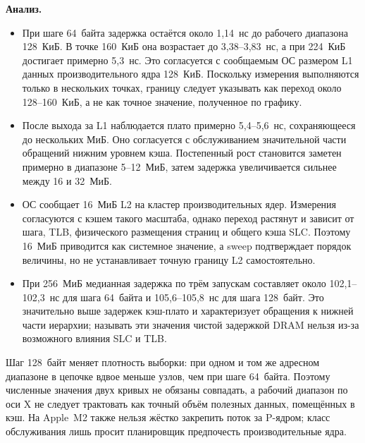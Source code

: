 \textbf{Анализ.}
\begin{itemize}
  \item При шаге 64~байта задержка остаётся около 1,14~нс до рабочего диапазона 128~КиБ. В точке 160~КиБ она возрастает до 3,38--3,83~нс, а при 224~КиБ достигает примерно 5,3~нс. Это согласуется с сообщаемым ОС размером L1 данных производительного ядра 128~КиБ. Поскольку измерения выполняются только в нескольких точках, границу следует указывать как переход около 128--160~КиБ, а не как точное значение, полученное по графику.
  \item После выхода за L1 наблюдается плато примерно 5,4--5,6~нс, сохраняющееся до нескольких МиБ. Оно согласуется с обслуживанием значительной части обращений нижним уровнем кэша. Постепенный рост становится заметен примерно в диапазоне 5--12~МиБ, затем задержка увеличивается сильнее между 16 и 32~МиБ.
  \item ОС сообщает 16~МиБ L2 на кластер производительных ядер. Измерения согласуются с кэшем такого масштаба, однако переход растянут и зависит от шага, TLB, физического размещения страниц и общего кэша SLC. Поэтому 16~МиБ приводится как системное значение, а sweep подтверждает порядок величины, но не устанавливает точную границу L2 самостоятельно.
  \item При 256~МиБ медианная задержка по трём запускам составляет около 102,1--102,3~нс для шага 64~байта и 105,6--105,8~нс для шага 128~байт. Это значительно выше задержек кэш-плато и характеризует обращения к нижней части иерархии; называть эти значения чистой задержкой DRAM нельзя из-за возможного влияния SLC и TLB.
\end{itemize}

Шаг 128~байт меняет плотность выборки: при одном и том же адресном диапазоне в цепочке вдвое меньше узлов, чем при шаге 64~байта. Поэтому численные значения двух кривых не обязаны совпадать, а рабочий диапазон по оси X не следует трактовать как точный объём полезных данных, помещённых в кэш. На Apple~M2 также нельзя жёстко закрепить поток за P-ядром; класс обслуживания лишь просит планировщик предпочесть производительные ядра.
